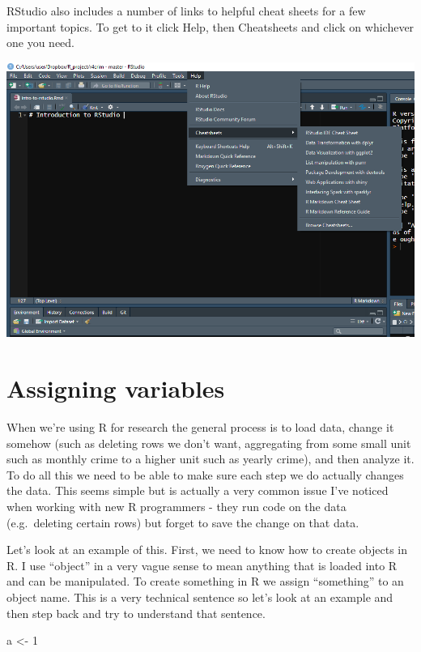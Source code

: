 \documentclass[
]{krantz}
\makeatletter
\newenvironment{Shaded}{\begin{snugshade}}{\end{snugshade}}
\newcommand{\DecValTok}[1]{\textcolor[rgb]{0.06,0.06,0.06}{#1}}
\newcommand{\NormalTok}[1]{#1}
\newcommand{\OtherTok}[1]{\textcolor[rgb]{0.37,0.37,0.37}{#1}}
\newenvironment{kframe}{%
\medskip{}
\setlength{\fboxsep}{.8em}
 \def\at@end@of@kframe{}%
 \ifinner\ifhmode%
  \def\at@end@of@kframe{\end{minipage}}%
  \begin{minipage}{\columnwidth}%
 \fi\fi%
 \def\FrameCommand##1{\hskip\@totalleftmargin \hskip-\fboxsep
 \colorbox{shadecolor}{##1}\hskip-\fboxsep
     \hskip-\linewidth \hskip-\@totalleftmargin \hskip\columnwidth}%
 \MakeFramed {\advance\hsize-\width
   \@totalleftmargin\z@ \linewidth\hsize
   \@setminipage}}%
 {\par\unskip\endMakeFramed%
 \at@end@of@kframe}
\renewenvironment{Shaded}{\begin{kframe}}{\end{kframe}}
\makeatother
\begin{document}
RStudio also includes a number of links to helpful cheat sheets for a few important topics. To get to it click Help, then Cheatsheets and click on whichever one you need.

\includegraphics{images/rstudio_4.PNG}

\hypertarget{assignment}{%
\section{Assigning variables}\label{assignment}}

When we're using R for research the general process is to load data, change it somehow (such as deleting rows we don't want, aggregating from some small unit such as monthly crime to a higher unit such as yearly crime), and then analyze it. To do all this we need to be able to make sure each step we do actually changes the data. This seems simple but is actually a very common issue I've noticed when working with new R programmers - they run code on the data (e.g.~deleting certain rows) but forget to save the change on that data.

Let's look at an example of this. First, we need to know how to create objects in R. I use ``object'' in a very vague sense to mean anything that is loaded into R and can be manipulated. To create something in R we assign ``something'' to an object name. This is a very technical sentence so let's look at an example and then step back and try to understand that sentence.

\begin{Shaded}
\begin{Highlighting}[]
\NormalTok{a }\OtherTok{\textless{}{-}} \DecValTok{1}
\end{Highlighting}
\end{Shaded}
\end{document}
